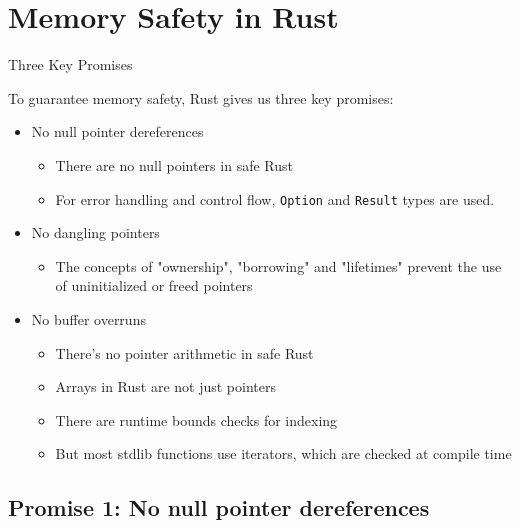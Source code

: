 \section{Memory Safety in Rust}


\begin{frame}{Three Key Promises}

To guarantee memory safety, Rust gives us three key promises:

\begin{itemize}
	\item No null pointer dereferences
		\pause
		\begin{itemize}
			\item There are no null pointers in safe Rust
			\item For error handling and control flow, \texttt{Option} and
				\texttt{Result} types are used.
		\end{itemize}
	\pause
	\item No dangling pointers
		\pause
		\begin{itemize}
			\item The concepts of "ownership", "borrowing" and "lifetimes" prevent the
				use of uninitialized or freed pointers
		\end{itemize}
	\pause
	\item No buffer overruns
		\pause
		\begin{itemize}
			\item There's no pointer arithmetic in safe Rust
			\item Arrays in Rust are not just pointers
			\item There are runtime bounds checks for indexing
			\item But most stdlib functions use iterators, which are checked at
				compile time
		\end{itemize}
\end{itemize}

\end{frame}


\subsection{Promise 1: No null pointer dereferences}


